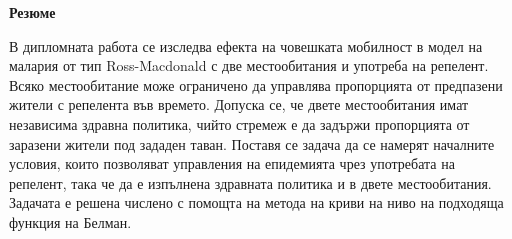 
\begin{center}
  \vspace*{1cm}

  \Huge
  \textbf{Резюме}
  \vspace*{0.5cm}

  \large
  В дипломната работа се изследва ефекта на човешката мобилност в модел на малария от тип Ross-Macdonald с две местообитания и употреба на репелент.
  Всяко местообитание може ограничено да управлява пропорцията от предпазени жители с репелента във времето.
  Допуска се, че двете местообитания имат независима здравна политика, чийто стремеж е да задържи пропорцията от заразени жители под зададен таван.
  Поставя се задача да се намерят началните условия, които позволяват управления на епидемията чрез употребата на репелент, така че да е изпълнена здравната политика и в двете местообитания.
  Задачата е решена числено с помощта на метода на криви на ниво на подходяща функция на Белман.
\end{center}

\thispagestyle{empty}
